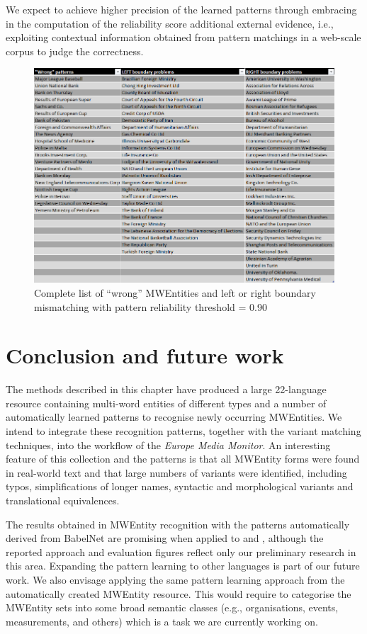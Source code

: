 \documentclass[output=paper]{langsci/langscibook}
\begin{document}
We expect to achieve higher precision of the learned patterns through
embracing in the computation of the reliability score additional
external evidence, i.e., exploiting contextual information obtained
from pattern matchings in a web-scale corpus to judge the correctness.\largerpage

\begin{figure}[H]
\includegraphics[width=.9\textwidth]{figures/error_analysis.png}
\caption{Complete list of ``wrong'' MWEntities and left or right boundary mismatching with pattern reliability threshold = 0.90}
\label{jac:fig:error_analysis}
\end{figure}


\section{Conclusion and future work}
The methods described in this chapter have produced a large 22-language resource containing multi-word entities of different types and a number of automatically learned patterns to recognise newly occurring MWEntities. We intend to integrate these recognition patterns, together with the variant matching techniques, into the workflow of the \textit{Europe Media Monitor}. An interesting feature of this collection and the patterns is that all MWEntity forms were found in real-world text and that large numbers of variants were identified, including typos, simplifications of longer names, syntactic and morphological variants and translational equivalences.

The results obtained in MWEntity recognition with the patterns automatically derived from BabelNet are promising when applied to  and , although the reported approach and evaluation figures reflect only our preliminary research in this area. Expanding the pattern learning to other languages is part of our future work. We also envisage applying the same pattern learning approach from the automatically created MWEntity resource. This would require to categorise the MWEntity sets into some broad semantic classes (e.g., organisations, events, measurements, and others) which is a task we are currently working on.
\end{document}
